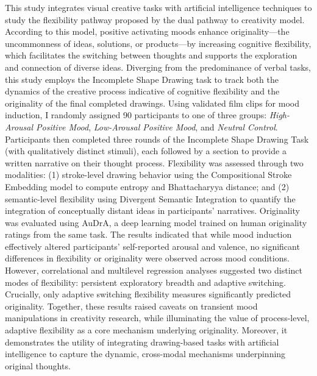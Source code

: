 \documentclass[../MA_Thesis.tex]{subfiles}
\begin{document}
This study integrates visual creative tasks with artificial intelligence techniques to study the flexibility pathway proposed by the dual pathway to creativity model. According to this model, positive activating moods enhance originality—the uncommonness of ideas, solutions, or products—by increasing cognitive flexibility, which facilitates the switching between thoughts and supports the exploration and connection of diverse ideas. Diverging from the predominance of verbal tasks, this study employs the Incomplete Shape Drawing task to track both the dynamics of the creative process indicative of cognitive flexibility and the originality of the final completed drawings. Using validated film clips for mood induction, I randomly assigned 90 participants to one of three groups: \textit{High-Arousal Positive Mood}, \textit{Low-Arousal Positive Mood}, and \textit{Neutral Control}. Participants then completed three rounds of the Incomplete Shape Drawing Task (with qualitatively distinct stimuli), each followed by a section to provide a written narrative on their thought process. Flexibility was assessed through two modalities: (1) stroke-level drawing behavior using the Compositional Stroke Embedding model to compute entropy and Bhattacharyya distance; and (2) semantic-level flexibility using Divergent Semantic Integration to quantify the integration of conceptually distant ideas in participants’ narratives. Originality was evaluated using AuDrA, a deep learning model trained on human originality ratings from the same task. The results indicated that while mood induction effectively altered participants’ self-reported arousal and valence, no significant differences in flexibility or originality were observed across mood conditions. However, correlational and multilevel regression analyses suggested two distinct modes of flexibility: persistent exploratory breadth and adaptive switching. Crucially, only adaptive switching flexibility measures significantly predicted originality. Together, these results raised caveats on transient mood manipulations in creativity research, while illuminating the value of process-level, adaptive flexibility as a core mechanism underlying originality. Moreover, it demonstrates the utility of integrating drawing-based tasks with artificial intelligence to capture the dynamic, cross-modal mechanisms underpinning original thoughts.
\end{document}
